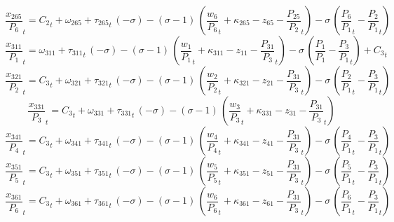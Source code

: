 \begin{dmath}
{{\frac{x_{265}}{P_{6}}}}_{t}={{C_{2}}}_{t}+{{\omega_{265}}}+{{\tau_{265}}}_{t}\, \left(-{{\sigma}}\right)-\left({{\sigma}}-1\right)\, \left({{\frac{w_{6}}{P_{6}}}}_{t}+{{\kappa_{265}}}-{{z_{65}}}-{{\frac{P_{25}}{P_{2}}}}_{t}\right)-{{\sigma}}\, \left({{\frac{P_{6}}{P_{1}}}}_{t}-{{\frac{P_{2}}{P_{1}}}}_{t}\right)
\end{dmath}
\begin{dmath}
{{\frac{x_{311}}{P_{1}}}}_{t}={{\omega_{311}}}+{{\tau_{311}}}_{t}\, \left(-{{\sigma}}\right)-\left({{\sigma}}-1\right)\, \left({{\frac{w_{1}}{P_{1}}}}_{t}+{{\kappa_{311}}}-{{z_{11}}}-{{\frac{P_{31}}{P_{3}}}}_{t}\right)-{{\sigma}}\, \left({{\frac{P_{1}}{P_{1}}}}-{{\frac{P_{3}}{P_{1}}}}_{t}\right)+{{C_{3}}}_{t}
\end{dmath}
\begin{dmath}
{{\frac{x_{321}}{P_{2}}}}_{t}={{C_{3}}}_{t}+{{\omega_{321}}}+{{\tau_{321}}}_{t}\, \left(-{{\sigma}}\right)-\left({{\sigma}}-1\right)\, \left({{\frac{w_{2}}{P_{2}}}}_{t}+{{\kappa_{321}}}-{{z_{21}}}-{{\frac{P_{31}}{P_{3}}}}_{t}\right)-{{\sigma}}\, \left({{\frac{P_{2}}{P_{1}}}}_{t}-{{\frac{P_{3}}{P_{1}}}}_{t}\right)
\end{dmath}
\begin{dmath}
{{\frac{x_{331}}{P_{3}}}}_{t}={{C_{3}}}_{t}+{{\omega_{331}}}+{{\tau_{331}}}_{t}\, \left(-{{\sigma}}\right)-\left({{\sigma}}-1\right)\, \left({{\frac{w_{3}}{P_{3}}}}_{t}+{{\kappa_{331}}}-{{z_{31}}}-{{\frac{P_{31}}{P_{3}}}}_{t}\right)
\end{dmath}
\begin{dmath}
{{\frac{x_{341}}{P_{4}}}}_{t}={{C_{3}}}_{t}+{{\omega_{341}}}+{{\tau_{341}}}_{t}\, \left(-{{\sigma}}\right)-\left({{\sigma}}-1\right)\, \left({{\frac{w_{4}}{P_{4}}}}_{t}+{{\kappa_{341}}}-{{z_{41}}}-{{\frac{P_{31}}{P_{3}}}}_{t}\right)-{{\sigma}}\, \left({{\frac{P_{4}}{P_{1}}}}_{t}-{{\frac{P_{3}}{P_{1}}}}_{t}\right)
\end{dmath}
\begin{dmath}
{{\frac{x_{351}}{P_{5}}}}_{t}={{C_{3}}}_{t}+{{\omega_{351}}}+{{\tau_{351}}}_{t}\, \left(-{{\sigma}}\right)-\left({{\sigma}}-1\right)\, \left({{\frac{w_{5}}{P_{5}}}}_{t}+{{\kappa_{351}}}-{{z_{51}}}-{{\frac{P_{31}}{P_{3}}}}_{t}\right)-{{\sigma}}\, \left({{\frac{P_{5}}{P_{1}}}}_{t}-{{\frac{P_{3}}{P_{1}}}}_{t}\right)
\end{dmath}
\begin{dmath}
{{\frac{x_{361}}{P_{6}}}}_{t}={{C_{3}}}_{t}+{{\omega_{361}}}+{{\tau_{361}}}_{t}\, \left(-{{\sigma}}\right)-\left({{\sigma}}-1\right)\, \left({{\frac{w_{6}}{P_{6}}}}_{t}+{{\kappa_{361}}}-{{z_{61}}}-{{\frac{P_{31}}{P_{3}}}}_{t}\right)-{{\sigma}}\, \left({{\frac{P_{6}}{P_{1}}}}_{t}-{{\frac{P_{3}}{P_{1}}}}_{t}\right)
\end{dmath}
